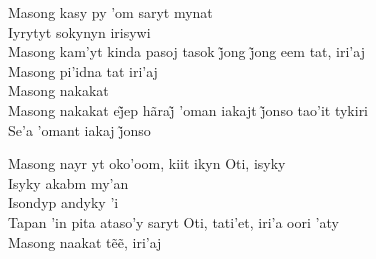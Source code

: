 \bigskip

\begin{linenumbers}
\noindent Masong kasy py 'om saryt mynat\\
Iyrytyt sokynyn irisywi\\
Masong kam’yt kinda pasoj tasok j̃ong j̃ong eem tat, iri’aj\\
Masong pi'idna tat iri'aj\\
Masong nakakat\\
Masong nakakat ej̃ep hãraj̃ ’oman iakajt j̃onso tao’it tykiri\\
Se’a ’omant iakaj j̃onso

\end{linenumbers}

\bigskip

\begin{linenumbers}
\noindent Masong nayr yt oko'oom, kiit ikyn Oti, isyky\\
Isyky akabm my'an\\
Isondyp andyky 'i\\
Tapan 'in pita ataso'y saryt Oti, tati'et, iri'a oori 'aty\\
Masong naakat tẽẽ, iri’aj

\end{linenumbers}

\bigskip

